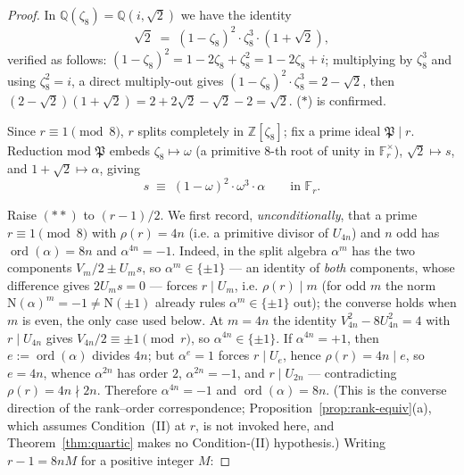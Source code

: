\documentclass[11pt]{amsart}
\theoremstyle{plain}
\theoremstyle{definition}
\theoremstyle{remark}
\numberwithin{equation}{section}
\newcommand{\ord}{\operatorname{ord}}
\newcommand{\Z}{\mathbb{Z}}
\newcommand{\Q}{\mathbb{Q}}
\newcommand{\F}{\mathbb{F}}
\begin{document}
\begin{proof}
In $\Q(\zeta_8) = \Q(i, \sqrt 2)$ we have the identity
\begin{equation*}
  \sqrt 2 \;=\; (1 - \zeta_8)^2 \cdot \zeta_8^3 \cdot (1 + \sqrt 2), \tag{$\ast$}
\end{equation*}
verified as follows: $(1 - \zeta_8)^2 = 1 - 2 \zeta_8 + \zeta_8^2 = 1 - 2 \zeta_8 + i$; multiplying by $\zeta_8^3$ and using $\zeta_8^2 = i$, a direct multiply-out gives $(1 - \zeta_8)^2 \cdot \zeta_8^3 = 2 - \sqrt 2$, then $(2 - \sqrt 2)(1 + \sqrt 2) = 2 + 2\sqrt 2 - \sqrt 2 - 2 = \sqrt 2$. ($\ast$) is confirmed.

Since $r \equiv 1 \pmod 8$, $r$ splits completely in $\Z[\zeta_8]$; fix a prime ideal $\mathfrak{P} \mid r$. Reduction mod $\mathfrak{P}$ embeds $\zeta_8 \mapsto \omega$ (a primitive 8-th root of unity in $\F_r^\times$), $\sqrt 2 \mapsto s$, and $1 + \sqrt 2 \mapsto \alpha$, giving
\begin{equation*}
  s \;\equiv\; (1 - \omega)^2 \cdot \omega^3 \cdot \alpha \qquad\text{in } \F_r. \tag{$\ast\ast$}
\end{equation*}

Raise $(\ast\ast)$ to $(r-1)/2$. We first record, \emph{unconditionally}, that a prime $r \equiv 1 \pmod 8$ with $\rho(r) = 4 n$ (i.e. a primitive divisor of $U_{4n}$) and $n$ odd has $\ord(\alpha) = 8 n$ and $\alpha^{4n} = -1$. Indeed, in the split algebra $\alpha^m$ has the two components $V_m/2 \pm U_m s$, so $\alpha^m \in \{\pm 1\}$ --- an identity of \emph{both} components, whose difference gives $2 U_m s = 0$ --- forces $r \mid U_m$, i.e. $\rho(r) \mid m$ (for odd $m$ the norm $\mathrm N(\alpha)^m = -1 \neq \mathrm N(\pm 1)$ already rules $\alpha^m \in \{\pm 1\}$ out); the converse holds when $m$ is even, the only case used below. At $m = 4 n$ the identity $V_{4n}^2 - 8 U_{4n}^2 = 4$ with $r \mid U_{4n}$ gives $V_{4n}/2 \equiv \pm 1 \pmod r$, so $\alpha^{4n} \in \{\pm 1\}$. If $\alpha^{4n} = +1$, then $e := \ord(\alpha)$ divides $4 n$; but $\alpha^e = 1$ forces $r \mid U_e$, hence $\rho(r) = 4 n \mid e$, so $e = 4 n$, whence $\alpha^{2n}$ has order $2$, $\alpha^{2n} = -1$, and $r \mid U_{2n}$ --- contradicting $\rho(r) = 4 n \nmid 2 n$. Therefore $\alpha^{4n} = -1$ and $\ord(\alpha) = 8 n$. (This is the converse direction of the rank--order correspondence; Proposition~\ref{prop:rank-equiv}(a), which assumes Condition~(II) at $r$, is not invoked here, and Theorem~\ref{thm:quartic} makes no Condition-(II) hypothesis.) Writing $r - 1 = 8 n M$ for a positive integer $M$:


\end{proof}
\end{document}
